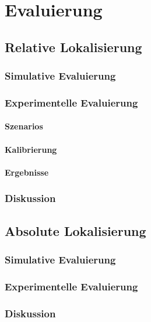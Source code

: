 \chapter{Evaluierung}
\label{chap:Messergebnisse}

\section{Relative Lokalisierung}
\label{sec:rel_lok}

\subsection{Simulative Evaluierung}
\subsection{Experimentelle Evaluierung}
\subsubsection{Szenarios}
\subsubsection{Kalibrierung}
\subsubsection{Ergebnisse}
\subsection{Diskussion}

\section{Absolute Lokalisierung}
\subsection{Simulative Evaluierung}
\subsection{Experimentelle Evaluierung}
\subsection{Diskussion}


